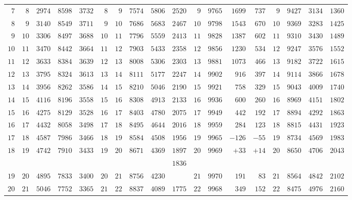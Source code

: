 \begin{center}
{{\begin{minipage}{.96\linewidth}
\begin{tabular}{r|r|r|r|r||r|r|r|r|r||r|r|r|r||r|r|r|r}
$7$ & $8$ & $2974$ & $8598$ & $3732$ & $8$ & $9$ & $7574$ & $5806$ & $2520$ & $9$ & $9765$ & $1699$ & $737$ & $9$ & $9427$ & $3134$ & $1360$\\
$8$ & $9$ & $3140$ & $8549$ & $3711$ & $9$ & $10$ & $7686$ & $5683$ & $2467$ & $10$ & $9798$ & $1543$ & $670$ & $10$ & $9369$ & $3283$ & $1425$\\[3pt]
$9$ & $10$ & $3306$ & $8497$ & $3688$ & $10$ & $11$ & $7796$ & $5559$ & $2413$ & $11$ & $9828$ & $1387$ & $602$ & $11$ & $9310$ & $3430$ & $1489$\\
$10$ & $11$ & $3470$ & $8442$ & $3664$ & $11$ & $12$ & $7903$ & $5433$ & $2358$ & $12$ & $9856$ & $1230$ & $534$ & $12$ & $9247$ & $3576$ & $1552$\\
$11$ & $12$ & $3633$ & $8384$ & $3639$ & $12$ & $13$ & $8008$ & $5306$ & $2303$ & $13$ & $9881$ & $1073$ & $466$ & $13$ & $9182$ & $3722$ & $1615$\\
$12$ & $13$ & $3795$ & $8324$ & $3613$ & $13$ & $14$ & $8111$ & $5177$ & $2247$ & $14$ & $9902$ & $916$ & $397$ & $14$ & $9114$ & $3866$ & $1678$\\
$13$ & $14$ & $3956$ & $8262$ & $3586$ & $14$ & $15$ & $8210$ & $5046$ & $2190$ & $15$ & $9921$ & $758$ & $329$ & $15$ & $9043$ & $4009$ & $1740$\\[3pt]
$14$ & $15$ & $4116$ & $8196$ & $3558$ & $15$ & $16$ & $8308$ & $4913$ & $2133$ & $16$ & $9936$ & $600$ & $260$ & $16$ & $8969$ & $4151$ & $1802$\\
$15$ & $16$ & $4275$ & $8129$ & $3528$ & $16$ & $17$ & $8403$ & $4780$ & $2075$ & $17$ & $9949$ & $442$ & $192$ & $17$ & $8894$ & $4292$ & $1863$\\
$16$ & $17$ & $4432$ & $8058$ & $3498$ & $17$ & $18$ & $8495$ & $4644$ & $2016$ & $18$ & $9959$ & $284$ & $123$ & $18$ & $8815$ & $4431$ & $1923$\\
$17$ & $18$ & $4587$ & $7986$ & $3466$ & $18$ & $19$ & $8584$ & $4508$ & $1956$ & $19$ & $9965$ & $-126$ & $-55$ & $19$ & $8734$ & $4569$ & $1983$\\
$18$ & $19$ & $4742$ & $7910$ & $3433$ & $19$ & $20$ & $8671$ & $4369$ & $1897$ & $20$ & $9969$ & $+33$ & $+14$ & $20$ & $8650$ & $4706$ & $2043$\\
 &  &  &  &  &  &  &  &  & $1836$ &  &  &  &  &  &  &  & \\
$19$ & $20$ & $4895$ & $7833$ & $3400$ & $20$ & $21$ & $8756$ & $4230$ &  & $21$ & $9970$ & $191$ & $83$ & $21$ & $8564$ & $4842$ & $2102$\\
$20$ & $21$ & $5046$ & $7752$ & $3365$ & $21$ & $22$ & $8837$ & $4089$ & $1775$ & $22$ & $9968$ & $349$ & $152$ & $22$ & $8475$ & $4976$ & $2160$\\

\end{tabular}
\end{minipage}}}
\end{center}
